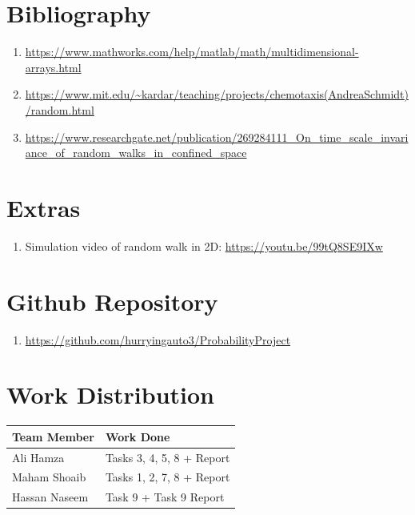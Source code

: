 \documentclass{article}
\begin{document}
\newpage
\section{Bibliography}

\begin{enumerate}
    \item \url{https://www.mathworks.com/help/matlab/math/multidimensional-arrays.html}
    \item \url{https://www.mit.edu/~kardar/teaching/projects/chemotaxis(AndreaSchmidt)/random.html}
    \item \url{https://www.researchgate.net/publication/269284111_On_time_scale_invariance_of_random_walks_in_confined_space}
\end{enumerate}

\section{Extras}
\begin{enumerate}
    \item Simulation video of random walk in 2D: \url{https://youtu.be/99tQ8SE9IXw}
\end{enumerate}

\section{Github Repository}
\begin{enumerate}
    \item \url{https://github.com/hurryingauto3/ProbabilityProject}
\end{enumerate}


\section{Work Distribution}

\begin{table}[h]

    \begin{tabular}{|l|l|}
    \hline
    \rowcolor[HTML]{C0C0C0} 
    {\color[HTML]{333333} \textbf{Team Member}} & {\color[HTML]{333333} \textbf{Work Done}} \\ \hline
    Ali Hamza     & Tasks 3, 4, 5, 8 + Report  \\ \hline
    Maham Shoaib  & Tasks 1, 2, 7, 8  + Report \\ \hline
    Hassan Naseem & Task 9 + Task 9 Report     \\ \hline
    \end{tabular}%
    \end{table}
\end{document}

